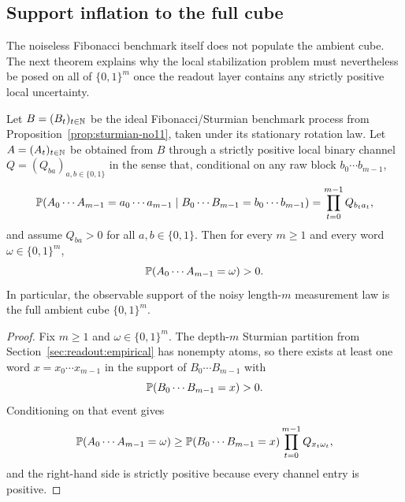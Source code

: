 \subsection{Support inflation to the full cube}\label{sec:readout:noise}

The noiseless Fibonacci benchmark itself does not populate the ambient cube. The next theorem explains why the local stabilization problem must nevertheless be posed on all of $\{0,1\}^m$ once the readout layer contains any strictly positive local uncertainty.

\begin{theorem}\label{thm:noise-full-support}
Let $B=(B_t)_{t\in\mathbb{N}}$ be the ideal Fibonacci/Sturmian benchmark process from Proposition~\ref{prop:sturmian-no11}, taken under its stationary rotation law. Let $A=(A_t)_{t\in\mathbb{N}}$ be obtained from $B$ through a strictly positive local binary channel $Q=(Q_{ba})_{a,b\in\{0,1\}}$ in the sense that, conditional on any raw block $b_0\cdots b_{m-1}$,
\[
\mathbb{P}(A_0\cdots A_{m-1}=a_0\cdots a_{m-1}\mid B_0\cdots B_{m-1}=b_0\cdots b_{m-1})
=
\prod_{t=0}^{m-1} Q_{b_t a_t},
\]
and assume $Q_{ba}>0$ for all $a,b\in\{0,1\}$. Then for every $m\ge 1$ and every word $\omega\in\{0,1\}^m$,
\[
\mathbb{P}(A_0\cdots A_{m-1}=\omega)>0.
\]
In particular, the observable support of the noisy length-$m$ measurement law is the full ambient cube $\{0,1\}^m$.
\end{theorem}

\begin{proof}
Fix $m\ge 1$ and $\omega\in\{0,1\}^m$. The depth-$m$ Sturmian partition from Section~\ref{sec:readout:empirical} has nonempty atoms, so there exists at least one word $x=x_0\cdots x_{m-1}$ in the support of $B_0\cdots B_{m-1}$ with
\[
\mathbb{P}(B_0\cdots B_{m-1}=x)>0.
\]
Conditioning on that event gives
\[
\mathbb{P}(A_0\cdots A_{m-1}=\omega)
\ge
\mathbb{P}(B_0\cdots B_{m-1}=x)\prod_{t=0}^{m-1}Q_{x_t\omega_t},
\]
and the right-hand side is strictly positive because every channel entry is positive.
\end{proof}

